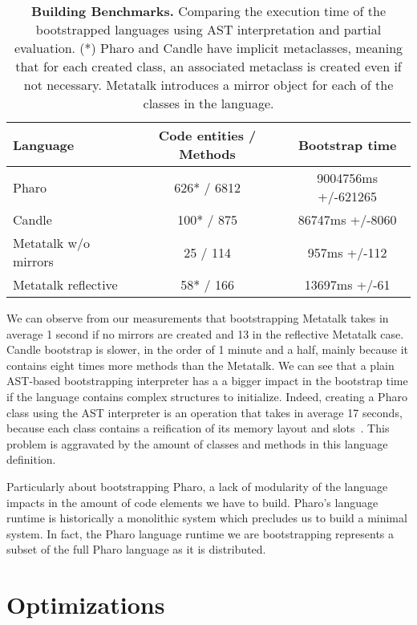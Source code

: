  \begin{table}[ht]
 \small
 	\centering
 	\begin{tabular}{|l|c|c|}
			\hline
			\textbf{Language}
			& \xspace\textbf{Code entities / Methods}\xspace
			& \xspace\textbf{Bootstrap time}\\
		\hline
		Pharo & 626* / 6812 & 9004756ms +/-621265 \\\hline
		Candle & 100* / 875 & 86747ms +/-8060 \\\hline
		Metatalk w/o mirrors & 25 / 114 & 957ms +/-112 \\\hline
		Metatalk reflective & 58* / 166 & 13697ms +/-61 \\\hline
 	\end{tabular}
		\vspace*{0.2cm}
 	\caption{\small\textbf{Building Benchmarks.} Comparing the execution time of the bootstrapped languages using AST interpretation and partial evaluation. (*) Pharo and Candle have implicit metaclasses, meaning that for each created class, an associated metaclass is created even if not necessary. Metatalk introduces a mirror object for each of the classes in the language.\label{tb:measurements}}
 \end{table}

We can observe from our measurements that bootstrapping Metatalk takes in average 1 second if no mirrors are created and 13 in the reflective Metatalk case. Candle bootstrap is slower, in the order of 1 minute and a half, mainly because it contains eight times more methods than the Metatalk. We can see that a plain AST-based bootstrapping interpreter has a a bigger impact in the bootstrap time if the language contains complex structures to initialize.  Indeed, creating a Pharo class using the AST interpreter is an operation that takes in average 17 seconds, because each class contains a reification of its memory layout and slots~\cite{Verw11a}. This problem is aggravated by the amount of classes and methods in this language definition.

Particularly about bootstrapping Pharo, a lack of modularity of the language impacts in the amount of code elements we have to build. Pharo's language runtime is historically a monolithic system which precludes us to build a minimal system. In fact, the Pharo language runtime we are bootstrapping represents a subset of the full Pharo language as it is distributed.

\section{Optimizations}\label{sec:optimisations}

